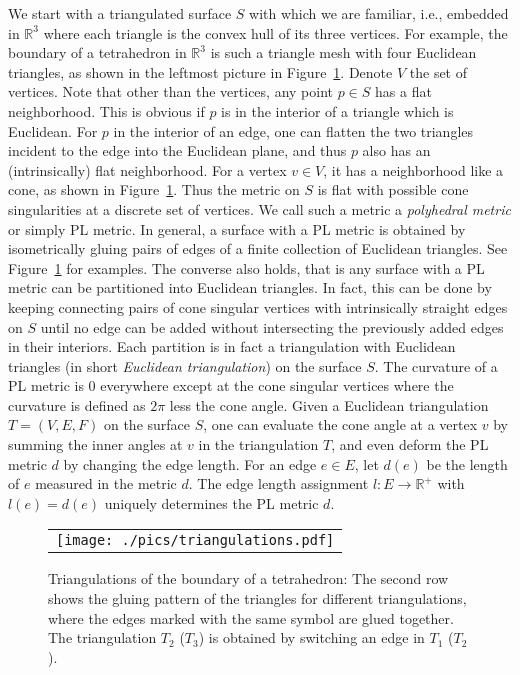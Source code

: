 \documentclass[11pt]{article}
\begin{document}
We start with a triangulated surface $S$ with which we are familiar, i.e., embedded in $\mathbb{R}^3$ 
where each triangle is the convex hull of its three vertices. For example, the boundary of a 
tetrahedron in $\mathbb{R}^3$ is such a triangle mesh with four Euclidean 
triangles, as shown in the leftmost picture in Figure~\ref{fig:triangulations}. 
Denote $V$ the set of vertices. 
Note that other than the vertices, any point $p\in S$ has a flat neighborhood. 
This is obvious if $p$ is in the interior of a triangle which is Euclidean. 
For $p$ in the interior of an edge, one can flatten the 
two triangles incident to the edge into the Euclidean plane, and thus $p$ also has
an (intrinsically) flat neighborhood. For a vertex $v\in V$, it has a neighborhood like a 
cone, as shown in Figure~\ref{fig:triangulations}. Thus the metric on $S$ is flat with possible
cone singularities at a discrete set of vertices. We call such a metric a {\it polyhedral metric} 
or simply  PL metric. In general, a surface with a PL metric is obtained by isometrically 
gluing pairs of edges of a finite collection of Euclidean triangles. See Figure~\ref{fig:triangulations}
for examples. The converse also holds, that is any surface with a PL metric can be 
partitioned into Euclidean triangles. In fact, this can be done by keeping connecting pairs 
of cone singular vertices with intrinsically straight edges on $S$ until no edge can be added
without intersecting the previously added edges in their interiors. Each partition is in fact
a triangulation with Euclidean triangles (in short {\it Euclidean triangulation}) on the surface $S$.
The curvature of a PL metric is $0$ everywhere except at the cone singular vertices where
the curvature is defined as $2\pi$ less the cone angle. Given a Euclidean triangulation
$T=(V, E, F)$ on the surface $S$,  one can evaluate the cone angle at a vertex $v$ 
by summing the inner angles at $v$ in the triangulation $T$, and even deform the PL metric $d$ 
by changing the edge length. For an edge $e\in E$, let $d(e)$ be the length of $e$ measured in the metric 
$d$. The edge length assignment $l:E \rightarrow \mathbb{R}^+$ with $l(e) = d(e)$ uniquely determines
the PL metric $d$.

\begin{figure}[t]
\begin{center}
\begin{tabular}{c}
\texttt{[image: ./pics/triangulations.pdf]}
\end{tabular}
\end{center}
\vspace{-0.1in}
\caption{Triangulations of the boundary of a tetrahedron: The second row shows the gluing pattern of 
the triangles for different triangulations, where the edges marked with the same symbol are glued together. 
The triangulation $T_2$ ($T_3$) is obtained by switching an edge in $T_1$ ($T_2$). 
\label{fig:triangulations}}
\end{figure}
\end{document}
